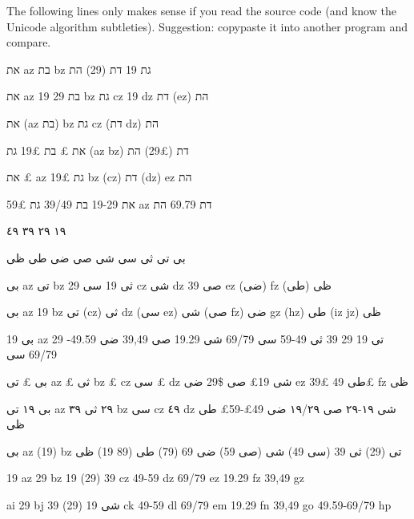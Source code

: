 \documentclass{book}
\begin{document}

\newpage

The following lines only makes sense if you read the source code (and 
know the Unicode algorithm subtleties). Suggestion: copypaste it into 
another program and compare.

\medskip

את az בת bz גת 19 דת (29) הת 

את az 19 בת 29 bz גת cz 19 dz דת (ez) הת 

את (az בת) bz גת cz (דת dz) הת 

את £ בת 19£ גת (az bz) דת (29£) הת 

את £ az 19£ גת bz (cz) דת (dz) ez הת 

את 19-29 בת 39/49 גת 59£ az דת 69.79 הת 

\medskip

١٩ ٢٩ ٣٩ ٤٩ 

بى تى ثى سى شى صى ضى طى ظى

بى az تى bz ثى 19 سى 29 cz شى dz 39 صى ez (ضى) fz (طى) ظى

بى az 19 bz تى (cz) ثى dz (سى ez) شى (صى fz) ضى gz (hz) طى (iz jz) ظى

بى 19 az 29 تى 19 29 39 ثى 49-59 سى 69/79 شى 19.29 صى 39,49 ضى 49.59-69/79 سى

بى £ تى az £ ثى bz £ cz سى £ dz شى 19£ صى \$29 ضى ez 39£ طى 49£ fz ظى

بى ١٩ تى az ٢٩ ثى ٣٩ bz سى cz ٤٩ dz شى ١٩-٢٩ صى ١٩/٢٩ ضى 49£-59£ طى ظى

بى az (19) bz تى (29) ثى 39 (سى 49) شى (صى 59) ضى 69 (79) طى (89 19)
ظى

19 az 29 bz 19 (29) 39 cz 49-59 dz 69/79 ez 19.29 fz 39,49 gz

ai 29 bj شى 19 (29) 39 ck 49-59 dl 69/79 em 19.29 fn 39,49 go
49.59-69/79 hp
\end{document}
